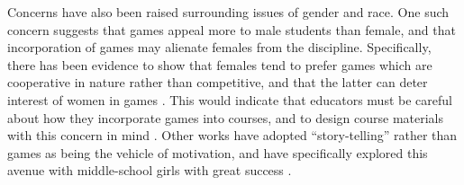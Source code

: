 Concerns have also been raised surrounding issues of gender and race.  One such concern suggests that games appeal more to male students than female, and that incorporation of games may alienate females from the discipline.  Specifically, there has been evidence to show that females tend to prefer games which are cooperative in nature rather than competitive, and that the latter can deter interest of women in games \cite{Camp02}.  This would indicate that educators must be careful about how they incorporate games into courses, and to design course materials with this concern in mind \cite{Carmichael08}.  Other works have adopted ``story-telling'' rather than games as being the vehicle of motivation, and have specifically explored this avenue with middle-school girls with great success \cite{Kelleher06}.

\begin{comment}
\cite{Natvig04,Barnes08} example of games being used
Some ideas about why creativity is important can be found in \cite{Farooq06}.
Games as a motivational tool: see ``International Conference on Game Development in Computer Science Education''.
An excellent outline of how games can be used successfully in CS curricula as well as how not only should we shoehorn games but also focus on fundamentals is summarized in \cite{Bayliss09}.  It also discusses what considerations should be made when incorporating games into courses.
\end{comment}
